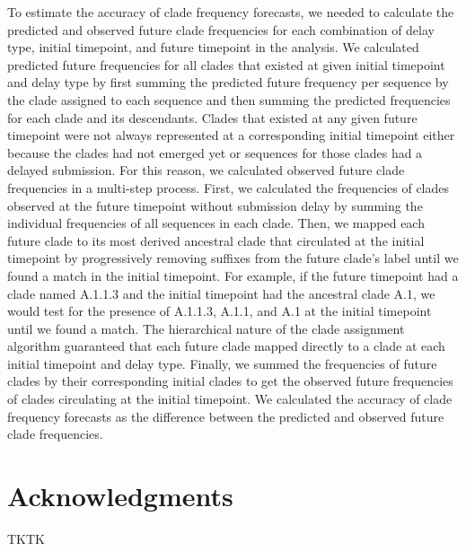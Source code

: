 \documentclass[9pt,lineno]{elife}
\begin{document}
To estimate the accuracy of clade frequency forecasts, we needed to calculate the predicted and observed future clade frequencies for each combination of delay type, initial timepoint, and future timepoint in the analysis.
We calculated predicted future frequencies for all clades that existed at given initial timepoint and delay type by first summing the predicted future frequency per sequence by the clade assigned to each sequence and then summing the predicted frequencies for each clade and its descendants.
Clades that existed at any given future timepoint were not always represented at a corresponding initial timepoint either because the clades had not emerged yet or sequences for those clades had a delayed submission.
For this reason, we calculated observed future clade frequencies in a multi-step process.
First, we calculated the frequencies of clades observed at the future timepoint without submission delay by summing the individual frequencies of all sequences in each clade.
Then, we mapped each future clade to its most derived ancestral clade that circulated at the initial timepoint by progressively removing suffixes from the future clade's label until we found a match in the initial timepoint.
For example, if the future timepoint had a clade named A.1.1.3 and the initial timepoint had the ancestral clade A.1, we would test for the presence of A.1.1.3, A.1.1, and A.1 at the initial timepoint until we found a match.
The hierarchical nature of the clade assignment algorithm guaranteed that each future clade mapped directly to a clade at each initial timepoint and delay type.
Finally, we summed the frequencies of future clades by their corresponding initial clades to get the observed future frequencies of clades circulating at the initial timepoint.
We calculated the accuracy of clade frequency forecasts as the difference between the predicted and observed future clade frequencies.

\section{Acknowledgments}

TKTK

\nocite{*} %

\end{document}
